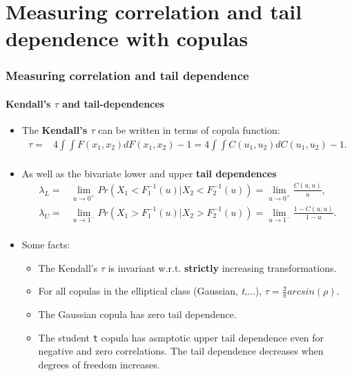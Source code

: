 \documentclass{beamer}
\begin{document}
\section{Measuring correlation and tail dependence with copulas}
\begin{frame}
  \frametitle{Measuring correlation and tail dependence}
  \framesubtitle{Kendall's $\tau$ and tail-dependences}
  \begin{itemize}
  \item The \textbf{Kendall's $\tau$} can be written in terms of copula function:
    \begin{equation*}
      \begin{split}
        \tau = & 4 \int \int F(x_1, x_2)dF(x_1,x_2)-1 = 4 \int \int C(u_1, u_2)dC(u_1,u_2)-1. \\
      \end{split}
    \end{equation*}

  \item As well as the bivariate lower and upper \textbf{tail dependences}
    \begin{equation*}
      \begin{split}
        \lambda_L = & \lim \limits_{u \to 0^{+}} Pr(X_1< F_1^{-1}(u)| X_2<F_2^{-1}(u))= \lim \limits_{u \to 0^{+}} \frac{C(u,u)}{u},\\
        \lambda_U=&\lim \limits_{u \to 1^{-}} Pr(X_1> F_1^{-1}(u)|
        X_2>F_2^{-1}(u))= \lim \limits_{u \to 1^{-}} \frac{1-C(u,u)}{1-u}.\\
      \end{split}
    \end{equation*}

  \item Some facts:
    \begin{itemize}
    \item The Kendall's $\tau$ is invariant w.r.t. \textbf{strictly} increasing transformations.
    \item For all copulas in the elliptical class (Gaussian, \emph{t},...),
      $\tau = \frac{2}{\pi}arcsin(\rho)$.
    \item The Gaussian copula has zero tail dependence.
    \item The  student \texttt{t} copula has asmptotic upper tail dependence even for negative
      and zero correlations. The tail dependence decreases when degrees of
      freedom increases.
    \end{itemize}
  \end{itemize}
\end{frame}
\end{document}
